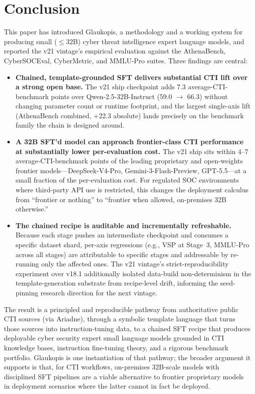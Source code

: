 \documentclass[unnumsec,webpdf,contemporary,large]{oup-authoring-template}
\theoremstyle{thmstyleone}
\theoremstyle{thmstyletwo}
\theoremstyle{thmstylethree}
\begin{document}
\section{Conclusion}

This paper has introduced Glaukopis, a methodology and a working system for producing small ($\le 32$B) cyber threat intelligence expert language models, and reported the v21 vintage's empirical evaluation against the AthenaBench, CyberSOCEval, CyberMetric, and MMLU-Pro suites. Three findings are central:

\begin{itemize}
  \item \textbf{Chained, template-grounded SFT delivers substantial CTI lift over a strong open base.} The v21 ship checkpoint adds 7.3 average-CTI-benchmark points over Qwen-2.5-32B-Instruct (59.0 $\to$ 66.3) without changing parameter count or runtime footprint, and the largest single-axis lift (AthenaBench combined, +22.3 absolute) lands precisely on the benchmark family the chain is designed around.
  \item \textbf{A 32B SFT'd model can approach frontier-class CTI performance at substantially lower per-evaluation cost.} The v21 ship sits within 4--7 average-CTI-benchmark points of the leading proprietary and open-weights frontier models---DeepSeek-V4-Pro, Gemini-3-Flash-Preview, GPT-5.5---at a small fraction of the per-evaluation cost. For regulated SOC environments where third-party API use is restricted, this changes the deployment calculus from ``frontier or nothing'' to ``frontier when allowed, on-premises 32B otherwise.''
  \item \textbf{The chained recipe is auditable and incrementally refreshable.} Because each stage pushes an intermediate checkpoint and consumes a specific dataset shard, per-axis regressions (e.g., VSP at Stage~3, MMLU-Pro across all stages) are attributable to specific stages and addressable by re-running only the affected ones. The v21 vintage's strict-reproducibility experiment over v18.1 additionally isolated data-build non-determinism in the template-generation substrate from recipe-level drift, informing the seed-pinning research direction for the next vintage.
\end{itemize}

The result is a principled and reproducible pathway from authoritative public CTI sources (via Ariadne), through a symbolic template language that turns those sources into instruction-tuning data, to a chained SFT recipe that produces deployable cyber security expert small language models grounded in CTI knowledge bases, instruction fine-tuning theory, and a rigorous benchmark portfolio. Glaukopis is one instantiation of that pathway; the broader argument it supports is that, for CTI workflows, on-premises 32B-scale models with disciplined SFT pipelines are a viable alternative to frontier proprietary models in deployment scenarios where the latter cannot in fact be deployed.
\end{document}
